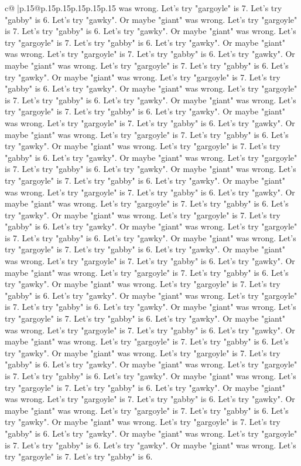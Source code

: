 \documentclass{article}
\begin{document}
{\begin{supertabular}{c@{$\;$}|p{.15\linewidth}@{}p{.15\linewidth}p{.15\linewidth}p{.15\linewidth}p{.15\linewidth}p{.15\linewidth}}
{{{was wrong. Let's try "gargoyle" is 7. Let's try "gabby" is 6. Let's try "gawky". Or maybe "giant" was wrong. Let's try "gargoyle" is 7. Let's try "gabby" is 6. Let's try "gawky". Or maybe "giant" was wrong. Let's try "gargoyle" is 7. Let's try "gabby" is 6. Let's try "gawky". Or maybe "giant" was wrong. Let's try "gargoyle" is 7. Let's try "gabby" is 6. Let's try "gawky". Or maybe "giant" was wrong. Let's try "gargoyle" is 7. Let's try "gabby" is 6. Let's try "gawky". Or maybe "giant" was wrong. Let's try "gargoyle" is 7. Let's try "gabby" is 6. Let's try "gawky". Or maybe "giant" was wrong. Let's try "gargoyle" is 7. Let's try "gabby" is 6. Let's try "gawky". Or maybe "giant" was wrong. Let's try "gargoyle" is 7. Let's try "gabby" is 6. Let's try "gawky". Or maybe "giant" was wrong. Let's try "gargoyle" is 7. Let's try "gabby" is 6. Let's try "gawky". Or maybe "giant" was wrong. Let's try "gargoyle" is 7. Let's try "gabby" is 6. Let's try "gawky". Or maybe "giant" was wrong. Let's try "gargoyle" is 7. Let's try "gabby" is 6. Let's try "gawky". Or maybe "giant" was wrong. Let's try "gargoyle" is 7. Let's try "gabby" is 6. Let's try "gawky". Or maybe "giant" was wrong. Let's try "gargoyle" is 7. Let's try "gabby" is 6. Let's try "gawky". Or maybe "giant" was wrong. Let's try "gargoyle" is 7. Let's try "gabby" is 6. Let's try "gawky". Or maybe "giant" was wrong. Let's try "gargoyle" is 7. Let's try "gabby" is 6. Let's try "gawky". Or maybe "giant" was wrong. Let's try "gargoyle" is 7. Let's try "gabby" is 6. Let's try "gawky". Or maybe "giant" was wrong. Let's try "gargoyle" is 7. Let's try "gabby" is 6. Let's try "gawky". Or maybe "giant" was wrong. Let's try "gargoyle" is 7. Let's try "gabby" is 6. Let's try "gawky". Or maybe "giant" was wrong. Let's try "gargoyle" is 7. Let's try "gabby" is 6. Let's try "gawky". Or maybe "giant" was wrong. Let's try "gargoyle" is 7. Let's try "gabby" is 6. Let's try "gawky". Or maybe "giant" was wrong. Let's try "gargoyle" is 7. Let's try "gabby" is 6. Let's try "gawky". Or maybe "giant" was wrong. Let's try "gargoyle" is 7. Let's try "gabby" is 6. Let's try "gawky". Or maybe "giant" was wrong. Let's try "gargoyle" is 7. Let's try "gabby" is 6. Let's try "gawky". Or maybe "giant" was wrong. Let's try "gargoyle" is 7. Let's try "gabby" is 6. Let's try "gawky". Or maybe "giant" was wrong. Let's try "gargoyle" is 7. Let's try "gabby" is 6. Let's try "gawky". Or maybe "giant" was wrong. Let's try "gargoyle" is 7. Let's try "gabby" is 6. Let's try "gawky". Or maybe "giant" was wrong. Let's try "gargoyle" is 7. Let's try "gabby" is 6. Let's try "gawky". Or maybe "giant" was wrong. Let's try "gargoyle" is 7. Let's try "gabby" is 6. Let's try "gawky". Or maybe "giant" was wrong. Let's try "gargoyle" is 7. Let's try "gabby" is 6. Let's try "gawky". Or maybe "giant" was wrong. Let's try "gargoyle" is 7. Let's try "gabby" is 6. Let's try "gawky". Or maybe "giant" was wrong. Let's try "gargoyle" is 7. Let's try "gabby" is 6. Let's try "gawky". Or maybe "giant" was wrong. Let's try "gargoyle" is 7. Let's try "gabby" is 6. Let's try "gawky". Or maybe "giant" was wrong. Let's try "gargoyle" is 7. Let's try "gabby" is 6. }}}
\end{supertabular}}
\end{document}

